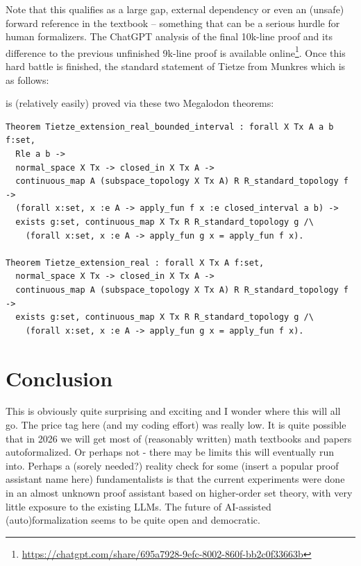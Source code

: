 \documentclass[a4paper,UKenglish,cleveref, autoref, thm-restate]{lipics-v2021}
\begin{document}
Note that this qualifies as a large gap, external dependency or even an (unsafe) forward reference in the
textbook -- something that can be a serious hurdle for human formalizers.
The ChatGPT analysis of the final 10k-line proof and its difference to the previous unfinished 9k-line proof is available online\footnote{\url{https://chatgpt.com/share/695a7928-9efc-8002-860f-bb2c0f33663b}}. 
%
%
Once this hard battle is finished, the standard statement of Tietze from Munkres which is as follows:
\begin{center}
\end{center}
%
%
%
%
%
%
is (relatively easily) proved via these two Megalodon theorems:
\begin{small}
\begin{verbatim}
Theorem Tietze_extension_real_bounded_interval : forall X Tx A a b f:set,
  Rle a b ->
  normal_space X Tx -> closed_in X Tx A ->
  continuous_map A (subspace_topology X Tx A) R R_standard_topology f ->
  (forall x:set, x :e A -> apply_fun f x :e closed_interval a b) ->
  exists g:set, continuous_map X Tx R R_standard_topology g /\
    (forall x:set, x :e A -> apply_fun g x = apply_fun f x).

Theorem Tietze_extension_real : forall X Tx A f:set,
  normal_space X Tx -> closed_in X Tx A ->
  continuous_map A (subspace_topology X Tx A) R R_standard_topology f ->
  exists g:set, continuous_map X Tx R R_standard_topology g /\
    (forall x:set, x :e A -> apply_fun g x = apply_fun f x).
\end{verbatim}
\end{small}  


\section{Conclusion}
This is obviously quite surprising and exciting and I wonder where this will all
go. The price tag here (and my coding effort) was really low. It is quite possible that in 2026 we will get most of (reasonably written)
math textbooks and papers autoformalized. Or perhaps not - there may be limits
this will eventually run into. Perhaps a (sorely needed?) reality check for some
(insert a popular proof assistant name here) fundamentalists is that the current
experiments were done in an almost unknown proof assistant based on higher-order
set theory, with very little exposure to the existing LLMs. The future of
AI-assisted (auto)formalization seems to be quite open and democratic.
\end{document}
